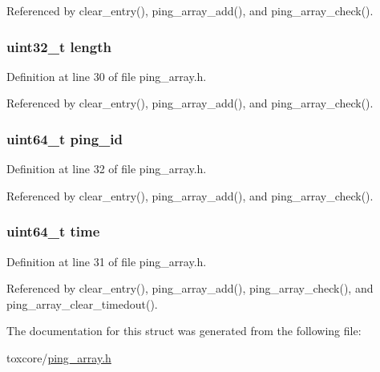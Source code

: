 Referenced by clear\+\_\+entry(), ping\+\_\+array\+\_\+add(), and ping\+\_\+array\+\_\+check().

\hypertarget{struct_ping___array___entry_aebb70c2aab3407a9f05334c47131a43b}{
\subsubsection[{length}]{\setlength{\rightskip}{0pt plus 5cm}uint32\+\_\+t length}}\label{struct_ping___array___entry_aebb70c2aab3407a9f05334c47131a43b}


Definition at line 30 of file ping\+\_\+array.\+h.



Referenced by clear\+\_\+entry(), ping\+\_\+array\+\_\+add(), and ping\+\_\+array\+\_\+check().

\hypertarget{struct_ping___array___entry_acec02fbdff648ca71a6d8e5a0d63d634}{
\subsubsection[{ping\+\_\+id}]{\setlength{\rightskip}{0pt plus 5cm}uint64\+\_\+t ping\+\_\+id}}\label{struct_ping___array___entry_acec02fbdff648ca71a6d8e5a0d63d634}


Definition at line 32 of file ping\+\_\+array.\+h.



Referenced by clear\+\_\+entry(), ping\+\_\+array\+\_\+add(), and ping\+\_\+array\+\_\+check().

\hypertarget{struct_ping___array___entry_a5d34a8f2dfe25421b2b473a5fd37b0ed}{
\subsubsection[{time}]{\setlength{\rightskip}{0pt plus 5cm}uint64\+\_\+t time}}\label{struct_ping___array___entry_a5d34a8f2dfe25421b2b473a5fd37b0ed}


Definition at line 31 of file ping\+\_\+array.\+h.



Referenced by clear\+\_\+entry(), ping\+\_\+array\+\_\+add(), ping\+\_\+array\+\_\+check(), and ping\+\_\+array\+\_\+clear\+\_\+timedout().



The documentation for this struct was generated from the following file\+:\begin{DoxyCompactItemize}
\item 
toxcore/\hyperlink{ping__array_8h}{ping\+\_\+array.\+h}\end{DoxyCompactItemize}
